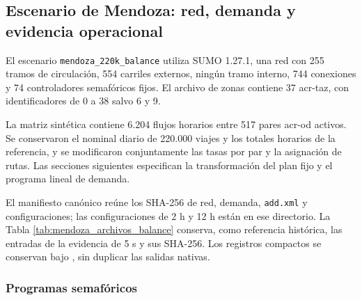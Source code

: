 \subsection{Escenario de Mendoza: red, demanda y evidencia operacional}
\label{sec:procedencia_mendoza}
\label{subsec:procedimiento_demanda_mendoza}

El escenario \texttt{mendoza\_220k\_balance} utiliza SUMO 1.27.1, una red con 255 tramos de circulación, 554 carriles externos, ningún tramo interno, 744 conexiones y 74 controladores semafóricos fijos. El archivo de zonas contiene 37 \acrshort{acr-taz}, con identificadores de 0 a 38 salvo 6 y 9.

La matriz sintética contiene 6.204 flujos horarios entre 517 pares \acrshort{acr-od} activos. Se conservaron el nominal diario de 220.000 viajes y los totales horarios de la referencia, y se modificaron conjuntamente las tasas por par y la asignación de rutas. Las secciones siguientes especifican la transformación del plan fijo y el programa lineal de demanda.

El manifiesto canónico  reúne los SHA-256 de red, demanda, \texttt{add.xml} y configuraciones; las configuraciones de 2 h y 12 h están en ese directorio. La Tabla \ref{tab:mendoza_archivos_balance} conserva, como referencia histórica, las entradas de la evidencia de 5 s y sus SHA-256. Los registros compactos se conservan bajo , sin duplicar las salidas nativas.

\begin{table}[H]\centering\small
\caption{Entradas de la evidencia histórica de 5 s y SHA-256.}\label{tab:mendoza_archivos_balance}

\end{table}

\subsubsection{Programas semafóricos}
\label{sec:mendoza_plan_fijo_apendice}

